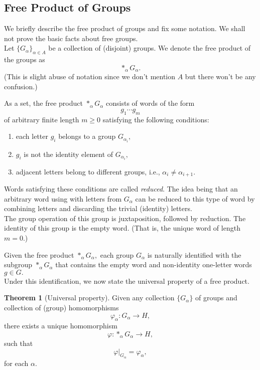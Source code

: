 \documentclass[12pt]{article}
\theoremstyle{definition}
\newtheorem{thm}{Theorem}
\numberwithin{thm}{section}
\begin{document}
\subsection{Free Product of Groups}
We briefly describe the free product of groups and fix some notation. We shall not prove the basic facts about free groups. \\
Let $\{G_\alpha\}_{\alpha \in A}$ be a collection of (disjoint) groups. We denote the free product of the groups as
\begin{equation*} 
	*_\alpha G_\alpha.
\end{equation*}
(This is slight abuse of notation since we don't mention $A$ but there won't be any confusion.)

As a set, the free product $*_\alpha G_\alpha$ consists of words of the form
\begin{equation*} 
	g_1\cdots g_m
\end{equation*}
of arbitrary finite length $m \ge 0$ satisfying the following conditions:
\begin{enumerate}
	\item each letter $g_i$ belongs to a group $G_{\alpha_i},$
	\item $g_i$ is not the identity element of $G_{\alpha_i},$
	\item adjacent letters belong to different groups, i.e., $\alpha_i \neq \alpha_{i + 1}.$	
\end{enumerate}
Words satisfying these conditions are called \emph{reduced}. The idea being that an arbitrary word using with letters from $G_\alpha$ can be reduced to this type of word by combining letters and discarding the trivial (identity) letters.\\
The group operation of this group is juxtaposition, followed by reduction. The identity of this group is the empty word. (That is, the unique word of length $m = 0.$)

Given the free product $*_\alpha G_\alpha,$ each group $G_\alpha$ is naturally identified with the subgroup $*_\alpha G_\alpha$ that contains the empty word and non-identity one-letter words $g \in G.$\\
Under this identification, we now state the universal property of a free product.
\begin{thm}[Universal property]
	Given any collection $\{G_\alpha\}$ of groups and collection of (group) homomorphisms
	\begin{equation*} 
		\varphi_\alpha: G_\alpha \to H,
	\end{equation*}
	there exists a unique homomorphism
	\begin{equation*} 
		\varphi:*_\alpha G_\alpha \to H,
	\end{equation*}
	such that
	\begin{equation*} 
		\varphi|_{G_\alpha} = \varphi_\alpha,
	\end{equation*}
	for each $\alpha.$
\end{thm}
\end{document}
